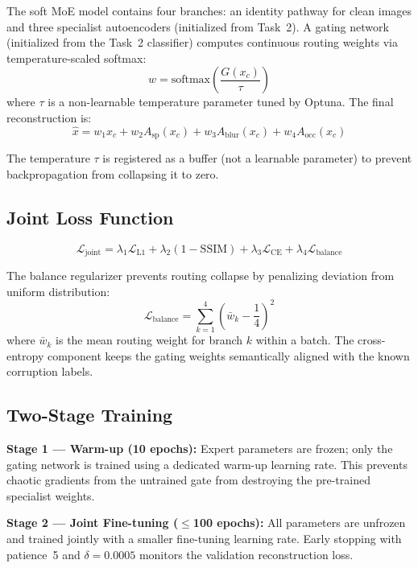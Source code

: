 \documentclass[conference]{IEEEtran}
\begin{document}
The soft MoE model contains four branches: an identity pathway for clean images and three specialist autoencoders (initialized from Task~2). A gating network (initialized from the Task~2 classifier) computes continuous routing weights via temperature-scaled softmax:
\begin{equation}
w = \text{softmax}\left(\frac{G(x_c)}{\tau}\right)
\end{equation}
where $\tau$ is a non-learnable temperature parameter tuned by Optuna. The final reconstruction is:
\begin{equation}
\hat{x} = w_1 x_c + w_2 A_{\text{sp}}(x_c) + w_3 A_{\text{blur}}(x_c) + w_4 A_{\text{occ}}(x_c)
\end{equation}

The temperature $\tau$ is registered as a buffer (not a learnable parameter) to prevent backpropagation from collapsing it to zero.

\subsection{Joint Loss Function}

\begin{equation}
\mathcal{L}_{\text{joint}} = \lambda_1 \mathcal{L}_{\text{L1}} + \lambda_2 (1 - \text{SSIM}) + \lambda_3 \mathcal{L}_{\text{CE}} + \lambda_4 \mathcal{L}_{\text{balance}}
\end{equation}

The balance regularizer prevents routing collapse by penalizing deviation from uniform distribution:
\begin{equation}
\mathcal{L}_{\text{balance}} = \sum_{k=1}^{4}\left(\bar{w}_k - \frac{1}{4}\right)^2
\end{equation}
where $\bar{w}_k$ is the mean routing weight for branch $k$ within a batch. The cross-entropy component keeps the gating weights semantically aligned with the known corruption labels.

\subsection{Two-Stage Training}

\textbf{Stage 1 — Warm-up (10 epochs):} Expert parameters are frozen; only the gating network is trained using a dedicated warm-up learning rate. This prevents chaotic gradients from the untrained gate from destroying the pre-trained specialist weights.

\textbf{Stage 2 — Joint Fine-tuning ($\leq$100 epochs):} All parameters are unfrozen and trained jointly with a smaller fine-tuning learning rate. Early stopping with patience~5 and $\delta = 0.0005$ monitors the validation reconstruction loss.
\end{document}
